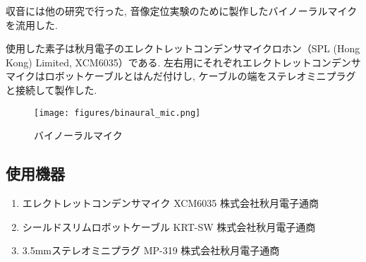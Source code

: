 収音には他の研究で行った, 音像定位実験のために製作したバイノーラルマイクを流用した. 

使用した素子は秋月電子のエレクトレットコンデンサマイクロホン（SPL (Hong Kong) Limited, XCM6035）である. 左右用にそれぞれエレクトレットコンデンサマイクはロボットケーブルとはんだ付けし, ケーブルの端をステレオミニプラグと接続して製作した. 

  \begin{figure}[H]
    \centering
    \texttt{[image: figures/binaural\_mic.png]}
    \caption{バイノーラルマイク}
    \label{fig:binaural_mic}
  \end{figure}

\subsection{使用機器}\label{used-equipments-mic}
  \begin{enumerate}
  \renewcommand{\labelenumi}{(\arabic{enumi})}
  \item
    エレクトレットコンデンサマイク XCM6035 株式会社秋月電子通商
    \cite{XCM6035:online}
  \item
    シールドスリムロボットケーブル KRT-SW 株式会社秋月電子通商
    \cite{sield_slim_robot_cable:online}
  \item
    3.5mmステレオミニプラグ MP-319 株式会社秋月電子通商
  \end{enumerate}


